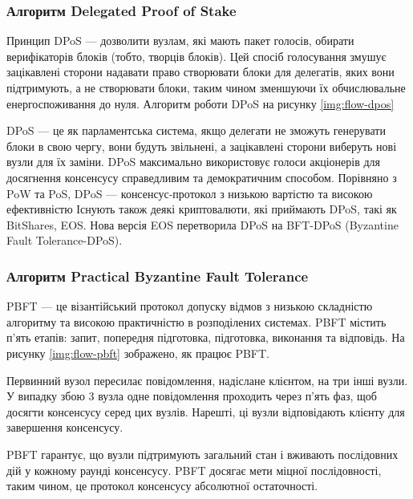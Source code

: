 \documentclass{lib/styles/default-style}
\begin{document}
    \subsubsection{Алгоритм Delegated Proof of Stake}

    Принцип DPoS --- дозволити вузлам, які мають пакет голосів,
    обирати верифікаторів блоків (тобто, творців блоків).
    Цей спосіб голосування змушує зацікавлені сторони надавати право створювати блоки для делегатів, яких вони підтримують,
    а не створювати блоки, таким чином зменшуючи їх обчислювальне енергоспоживання до нуля.
    Алгоритм роботи DPoS на рисунку \ref{img:flow-dpos}

    
    DPoS --- це як парламентська система, якщо делегати не зможуть генерувати блоки в свою чергу,
    вони будуть звільнені, а зацікавлені сторони виберуть нові вузли для їх заміни. DPoS максимально використовує
    голоси акціонерів для досягнення консенсусу справедливим та демократичним способом.
    Порівняно з PoW та PoS, DPoS --- консенсус-протокол з низькою вартістю та високою ефективністю
    Існують також деякі криптовалюти, які приймають DPoS, такі як BitShares, EOS.
    Нова версія EOS перетворила DPoS на BFT-DPoS (Byzantine Fault Tolerance-DPoS).

    \subsubsection{Алгоритм Practical Byzantine Fault Tolerance}

    PBFT --- це візантійський протокол допуску відмов з низькою складністю алгоритму та високою практичністю в розподілених системах.
    PBFT містить п’ять етапів: запит, попередня підготовка, підготовка, виконання та відповідь. На рисунку \ref{img:flow-pbft}
    зображено, як працює PBFT.


    Первинний вузол пересилає повідомлення, надіслане клієнтом, на три інші вузли.
    У випадку збою 3 вузла одне повідомлення проходить через п'ять фаз, щоб досягти консенсусу серед цих вузлів.
    Нарешті, ці вузли відповідають клієнту для завершення консенсусу.

    PBFT гарантує, що вузли підтримують загальний стан і вживають послідовних дій у кожному раунді консенсусу.
    PBFT досягає мети міцної послідовності, таким чином, це протокол консенсусу абсолютної остаточності.
    
\end{document}
